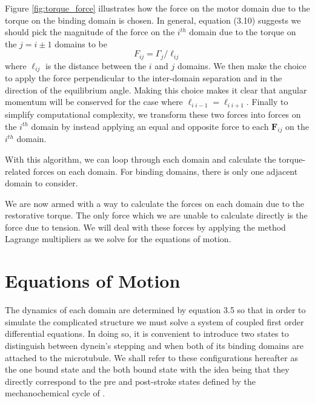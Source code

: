 	Figure \ref{fig:torque_force} illustrates how the force on the motor domain due to the torque on the binding domain is chosen. In general, equation (3.10) suggests we should pick the magnitude of the force on the $i^{th}$ domain due to the torque on the $j=i\pm1$ domains to be
	\begin{equation}
		F_{ij} = \Gamma_j / \ell_{ij}
	\end{equation}
	where $\ell_{ij}$ is the distance between the $i$ and $j$ domains. We then make the choice to apply the force perpendicular to the inter-domain separation and in the direction of the equilibrium angle. Making this choice makes it clear that angular momentum will be conserved for the case where $\ell_{i\;i-1}=\ell_{i\;i+1}$. Finally to simplify computational complexity, we transform these two forces into forces on the $i^{th}$ domain by instead applying an equal and opposite force to each $\mathbf{F}_{ij}$ on the $i^{th}$ domain. 
	
	With this algorithm, we can loop through each domain and calculate the torque-related forces on each domain. For binding domains, there is only one adjacent domain to consider. 
	
	We are now armed with a way to calculate the forces on each domain due to the restorative torque. The only force which we are unable to calculate directly is the force due to tension. We will deal with these forces by applying the method Lagrange multipliers as we solve for the equations of motion. 
	
	\section{Equations of Motion}
	The dynamics of each domain are determined by equation 3.5 so that in order to simulate the complicated structure we must solve a system of coupled first order differential equations. In doing so, it is convenient to introduce two states to distinguish between dynein's stepping and when both of its binding domains are attached to the microtubule. We shall refer to these configurations hereafter as the one bound state and the both bound state with the idea being that they directly correspond to the pre and post-stroke states defined by the mechanochemical cycle of \cite{cianfrocco2015mechanism}.  
	
